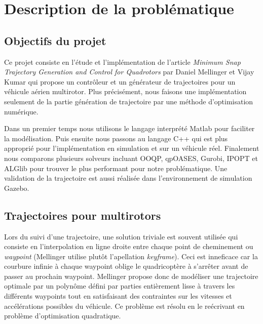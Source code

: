 \section{Description de la problématique}

\subsection{Objectifs du projet}

Ce projet consiste en l'étude et l'implémentation de l'article \textit{Minimum Snap Trajectory Generation and Control for Quadrotors} par Daniel Mellinger et Vijay Kumar \cite{Mellinger2011} qui propose un contrôleur et un générateur de trajectoires pour un véhicule aérien multirotor. Plus précisément, nous faisons une implémentation seulement de la partie génération de trajectoire par une méthode d'optimisation numérique. 

Dans un premier temps nous utilisons le langage interprété Matlab pour faciliter la modélisation. Puis ensuite nous passons au langage C++ qui est plus approprié pour l'implémentation en simulation et sur un véhicule réel. Finalement nous comparons plusieurs solveurs incluant OOQP, qpOASES, Gurobi, IPOPT et ALGlib pour trouver le plus performant pour notre problématique. Une validation de la trajectoire est aussi réalisée dans l'environnement de simulation Gazebo.

\subsection{Trajectoires pour multirotors}

Lors du suivi d'une trajectoire, une solution triviale est souvent utilisée qui consiste en l'interpolation en ligne droite entre chaque point de cheminement ou \textit{waypoint} (Mellinger utilise plutôt l'apellation \textit{keyframe}). Ceci est inneficace car la courbure infinie à chaque waypoint oblige le quadricoptère à s'arrêter avant de passer au prochain waypoint. Mellinger propose donc de modéliser une trajectoire optimale par un polynôme défini par parties entièrement lisse à travers les différents waypoints tout en satisfaisant des contraintes sur les vitesses et accélérations possibles du véhicule. Ce problème est résolu en le reécrivant en problème d'optimisation quadratique.

